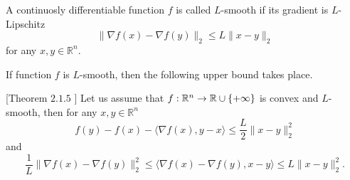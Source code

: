 \begin{definition}[$L$-smoothness]
A continuosly differentiable function $f$ is called $L$-smooth if its gradient is $L$-Lipschitz
\begin{equation}
    \|\nabla f(x) - \nabla f(y)\|_2\leq L\|x-y\|_2
\end{equation}
for any $x,y\in\mathbb{R}^n$.
\end{definition}

If function $f$ is $L$-smooth, then the following upper bound takes place.

\begin{lemma}\label{lm:descent}[Theorem $2.1.5$ \cite{nesterov-book}]
    Let us assume that $f:\mathbb{R}^n\rightarrow \mathbb{R}\cup\{+\infty\}$ is convex and $L$-smooth, then for any $x,y\in\mathbb{R}^n$
    \begin{equation}\label{eq:descent_lemma_1}
        f(y) - f(x) - \langle \nabla f(x), y-x\rangle\leq \frac{L}{2}\|x-y\|_2^2
    \end{equation}
    and
    \begin{equation}\label{eq:descent_lemma_2}
        \frac{1}{L}\|\nabla f(x) - \nabla f(y)\|_2^2 \leq\langle \nabla f(x) - \nabla f (y), x - y\rangle \leq L\|x-y\|_2^2.
    \end{equation}
\end{lemma}
